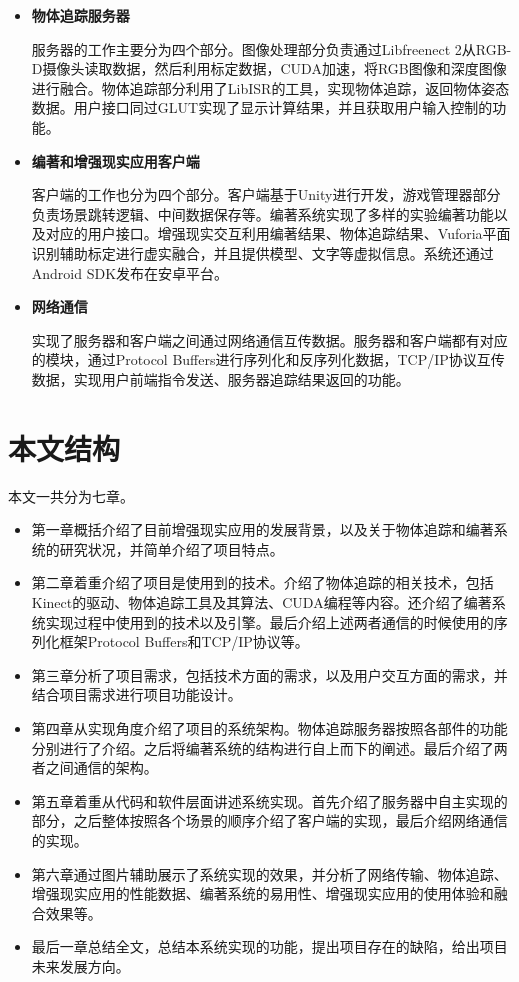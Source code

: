 \begin{itemize}
    \item \textbf{物体追踪服务器}
    
    服务器的工作主要分为四个部分。图像处理部分负责通过Libfreenect 2从RGB-D摄像头读取数据，然后利用标定数据，CUDA加速，将RGB图像和深度图像进行融合。物体追踪部分利用了LibISR\cite{Ren_3DV_2014, star3d_iccv_2013}的工具，实现物体追踪，返回物体姿态数据。用户接口同过GLUT实现了显示计算结果，并且获取用户输入控制的功能。
    
    \item \textbf{编著和增强现实应用客户端}
    
    客户端的工作也分为四个部分。客户端基于Unity进行开发，游戏管理器部分负责场景跳转逻辑、中间数据保存等。编著系统实现了多样的实验编著功能以及对应的用户接口。增强现实交互利用编著结果、物体追踪结果、Vuforia平面识别辅助标定进行虚实融合，并且提供模型、文字等虚拟信息。系统还通过Android SDK发布在安卓平台。
    
    \item \textbf{网络通信}
    
    实现了服务器和客户端之间通过网络通信互传数据。服务器和客户端都有对应的模块，通过Protocol Buffers进行序列化和反序列化数据，TCP/IP协议互传数据，实现用户前端指令发送、服务器追踪结果返回的功能。
\end{itemize}


\section{本文结构}
本文一共分为七章。
\begin{itemize}[noitemsep,topsep=0pt,parsep=0pt,partopsep=0pt]
\item 第一章概括介绍了目前增强现实应用的发展背景，以及关于物体追踪和编著系统的研究状况，并简单介绍了项目特点。
\item 第二章着重介绍了项目是使用到的技术。介绍了物体追踪的相关技术，包括Kinect的驱动、物体追踪工具及其算法、CUDA编程等内容。还介绍了编著系统实现过程中使用到的技术以及引擎。最后介绍上述两者通信的时候使用的序列化框架Protocol Buffers和TCP/IP协议等。
\item 第三章分析了项目需求，包括技术方面的需求，以及用户交互方面的需求，并结合项目需求进行项目功能设计。
\item 第四章从实现角度介绍了项目的系统架构。物体追踪服务器按照各部件的功能分别进行了介绍。之后将编著系统的结构进行自上而下的阐述。最后介绍了两者之间通信的架构。
\item 第五章着重从代码和软件层面讲述系统实现。首先介绍了服务器中自主实现的部分，之后整体按照各个场景的顺序介绍了客户端的实现，最后介绍网络通信的实现。
\item 第六章通过图片辅助展示了系统实现的效果，并分析了网络传输、物体追踪、增强现实应用的性能数据、编著系统的易用性、增强现实应用的使用体验和融合效果等。
\item 最后一章总结全文，总结本系统实现的功能，提出项目存在的缺陷，给出项目未来发展方向。
\end{itemize}
